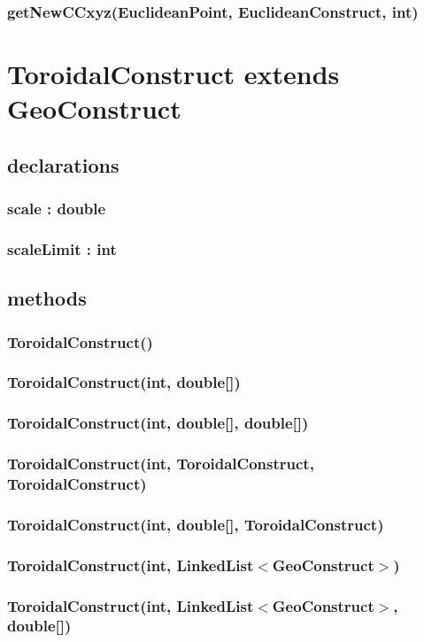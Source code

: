 \documentclass[a4paper,10pt]{report}
\begin{document}
\subsubsection{getNewCCxyz(EuclideanPoint, EuclideanConstruct, int)}
\section{ToroidalConstruct extends GeoConstruct}
\subsection{declarations}
\subsubsection{scale : double}
\subsubsection{scaleLimit : int}
\subsection{methods}
\subsubsection{ToroidalConstruct()}
\subsubsection{ToroidalConstruct(int, double[])}
\subsubsection{ToroidalConstruct(int, double[], double[])}
\subsubsection{ToroidalConstruct(int, ToroidalConstruct, ToroidalConstruct)}
\subsubsection{ToroidalConstruct(int, double[], ToroidalConstruct)}
\subsubsection{ToroidalConstruct(int, LinkedList$<$GeoConstruct$>$)}
\subsubsection{ToroidalConstruct(int, LinkedList$<$GeoConstruct$>$, double[])}
\end{document}
